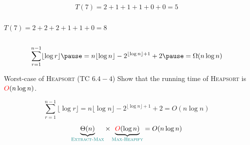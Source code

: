 \begin{frame}{}
  \centerline{}

  \pause

  \pause
  \vspace{-0.30cm}
  \[
    T(7) = 2 + 1 + 1 + 1 + 0 + 0 = 5
  \]

\end{frame}

\begin{frame}{}
  \begin{columns}
      \pause
      \[
	T(7) = 2 + 2 + 2 + 1 + 1 + 0 = 8
      \]
      \pause \centerline{\footnotesize {}}
    \pause
  \end{columns}

  \pause
  \vspace{0.60cm}
  \[
    \sum_{r=1}^{n-1} \lfloor \log r \rfloor \pause = n \lfloor \log  n \rfloor - 2^{\lfloor \log n \rfloor + 1} + 2 \pause = \Omega(n \log n)
  \]
\end{frame}

\begin{frame}{}
  \begin{exampleblock}{Worst-case of \textsc{Heapsort} (TC $6.4-4$)}
    Show that the  running time of \textsc{Heapsort} is $\textcolor{red}{O}(n \log n)$.
  \end{exampleblock}

  \pause
  \[
    \sum_{r=1}^{n-1} \lfloor \log r \rfloor = n \lfloor \log  n \rfloor - 2^{\lfloor \log n \rfloor + 1} + 2 = O(n \log n)
  \]

  \pause
  \vspace{0.30cm}
  \centerline{}

  \pause
  \vspace{0.30cm}
  \[
    \underbrace{\Theta(n)}_{\textcolor{teal}{\textsc{Extract-Max}}} \times \underbrace{\textcolor{red}{O}(\log n)}_{\textcolor{teal}{\textsc{Max-Heapify}}} = O(n \log n)
  \]
\end{frame}

